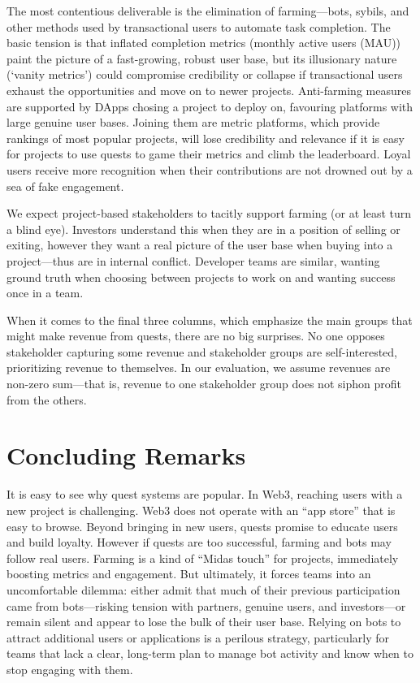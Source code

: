 The most contentious deliverable is the elimination of farming---bots, sybils, and other methods used by transactional users to automate task completion. The basic tension is that inflated completion metrics (\eg monthly active users (MAU)) paint the picture of a fast-growing, robust user base, but its illusionary nature (`vanity metrics') could compromise credibility or collapse if transactional users exhaust the opportunities and move on to newer projects. Anti-farming measures are supported by DApps chosing a project to deploy on, favouring platforms with large genuine user bases. Joining them are metric platforms, which provide rankings of most popular projects, will lose credibility and relevance if it is easy for projects to use quests to game their metrics and climb the leaderboard. Loyal users receive more recognition when their contributions are not drowned out by a sea of fake engagement.

We expect project-based stakeholders to tacitly support farming (or at least turn a blind eye). Investors understand this when they are in a position of selling or exiting, however they want a real picture of the user base when buying into a project---thus are in internal conflict. Developer teams are similar, wanting ground truth when choosing between projects to work on and wanting success once in a team. 

When it comes to the final three columns, which emphasize the main groups that might make revenue from quests, there are no big surprises. No one opposes stakeholder capturing some revenue and stakeholder groups are self-interested, prioritizing revenue to themselves. In our evaluation, we assume revenues are non-zero sum---that is, revenue to one stakeholder group does not siphon profit from the others.



% 


\section{Concluding Remarks}

It is easy to see why quest systems are popular. In Web3, reaching users with a new project is challenging. Web3 does not operate with an ``app store'' that is easy to browse. Beyond bringing in new users, quests promise to educate users and build loyalty. However if quests are too successful, farming and bots may follow real users. Farming is a kind of ``Midas touch'' for projects, immediately boosting metrics and engagement. But ultimately, it forces teams into an uncomfortable dilemma: either admit that much of their previous participation came from bots—risking tension with partners, genuine users, and investors—or remain silent and appear to lose the bulk of their user base. Relying on bots to attract additional users or applications is a perilous strategy, particularly for teams that lack a clear, long-term plan to manage bot activity and know when to stop engaging with them.




